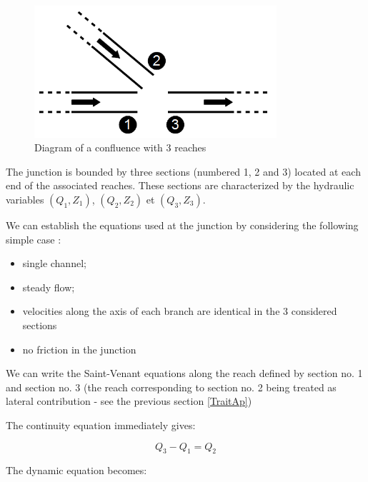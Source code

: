 \begin{figure}[H]
 \begin{center}
  \includegraphics[width=0.8\textwidth]{Figures/Schema_confluent.png}
  \caption{Diagram of a confluence with 3 reaches}
  \label{fig:SchemConf}
 \end{center}
\end{figure}

The junction is bounded by three sections (numbered 1, 2 and 3) located at each end of the associated reaches. These sections are characterized by the hydraulic variables $(Q_1,Z_1)$, $(Q_2,Z_2)$ et $(Q_3,Z_3)$.

We can establish the equations used at the junction by considering the following simple case :
\begin{itemize}
 \item single channel;
 \item steady flow;
 \item velocities along the axis of each branch are identical in the 3 considered sections
 \item no friction in the junction
\end{itemize}

We can write the Saint-Venant equations along the reach defined by section no. 1 and section no. 3 (the reach corresponding to section no. 2 being treated as lateral contribution - see the previous section \ref{TraitAp})


The continuity equation immediately gives:

\begin{equation}
  Q_3 - Q_1 = Q_2
\end{equation}

The dynamic equation becomes:

